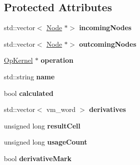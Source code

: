 \subsection*{Protected Attributes}
\begin{DoxyCompactItemize}
\item 
\mbox{\label{classathena_1_1core_1_1_node_aa46df2cfca5ac1bb88d683e52614397e}} 
std\+::vector$<$ \mbox{\hyperlink{classathena_1_1core_1_1_node}{Node}} $\ast$$>$ {\bfseries incoming\+Nodes}
\item 
\mbox{\label{classathena_1_1core_1_1_node_a156010639b24e35c17cbe15de5078bbb}} 
std\+::vector$<$ \mbox{\hyperlink{classathena_1_1core_1_1_node}{Node}} $\ast$$>$ {\bfseries outcoming\+Nodes}
\item 
\mbox{\label{classathena_1_1core_1_1_node_a27276034dd9d663c195e6233d32013be}} 
\mbox{\hyperlink{classathena_1_1core_1_1_op_kernel}{Op\+Kernel}} $\ast$ {\bfseries operation}
\item 
\mbox{\label{classathena_1_1core_1_1_node_a4f2c3e1d4c44cf45bfa78909d4df3777}} 
std\+::string {\bfseries name}
\item 
\mbox{\label{classathena_1_1core_1_1_node_a9b66b2c502174ec4253540e785ed65d1}} 
bool {\bfseries calculated}
\item 
\mbox{\label{classathena_1_1core_1_1_node_a753a10d861a9e65c0ceac674a64f93b2}} 
std\+::vector$<$ vm\+\_\+word $>$ {\bfseries derivatives}
\item 
\mbox{\label{classathena_1_1core_1_1_node_a3b79e7b88f22fac99cca9323bd2fb644}} 
unsigned long {\bfseries result\+Cell}
\item 
\mbox{\label{classathena_1_1core_1_1_node_ad8f1fef6f146b1fcc73b9333a5dc3fa0}} 
unsigned long {\bfseries usage\+Count}
\item 
\mbox{\label{classathena_1_1core_1_1_node_ad04d91c676f72a3e91e77486513e5080}} 
bool {\bfseries derivative\+Mark}
\end{DoxyCompactItemize}


